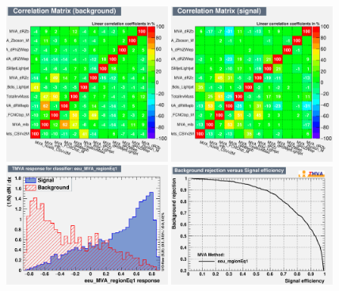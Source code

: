 \begin{figure}[htbp]
	\includegraphics[width=0.48\textwidth]{6_Search/Figures/MVAtechnics/toppairzct/eeu/CorrelationMatrixB.png}
	\includegraphics[width=0.48\textwidth]{6_Search/Figures/MVAtechnics/toppairzct/eeu/CorrelationMatrixS.png}
	\includegraphics[width=0.48\textwidth]{6_Search/Figures/MVAtechnics/toppairzct/eeu/mva_eeu_MVA_regionEq1.png}
	\includegraphics[width=0.48\textwidth]{6_Search/Figures/MVAtechnics/toppairzct/eeu/rejBvsS.png}

\end{figure}
